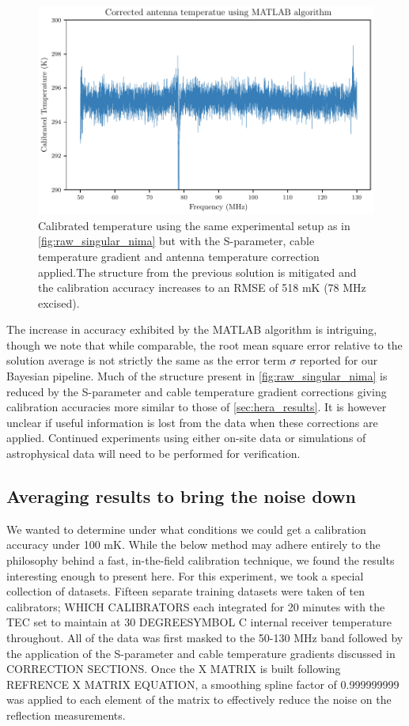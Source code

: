 \begin{figure}
    \centering
    \includegraphics[width=.8\textwidth]{corrected_matlab_solution}
    \caption{Calibrated temperature using the same experimental setup as in \cref{fig:raw_singular_nima} but with the S-parameter, cable temperature gradient and antenna temperature correction applied.The structure from the previous solution is mitigated and the calibration accuracy increases to an RMSE of 518 mK (78 MHz excised).}
    \label{fig:corrected_singular_nima}
\end{figure}

The increase in accuracy exhibited by the MATLAB algorithm is intriguing, though we note that while comparable, the root mean square error relative to the solution average is not strictly the same as the error term $\sigma$ reported for our Bayesian pipeline. Much of the structure present in \cref{fig:raw_singular_nima} is reduced by the S-parameter and cable temperature gradient corrections giving calibration accuracies more similar to those of \cref{sec:hera_results}. It is however unclear if useful information is lost from the data when these corrections are applied. Continued experiments using either on-site data or simulations of astrophysical data will need to be performed for verification.

\subsection{Averaging results to bring the noise down}\label{matlab_avg_results}
We wanted to determine under what conditions we could get a calibration accuracy under 100 mK. While the below method may adhere entirely to the philosophy behind a fast, in-the-field calibration technique, we found the results interesting enough to present here. For this experiment, we took a special collection of datasets. Fifteen separate training datasets were taken of ten calibrators; WHICH CALIBRATORS each integrated for 20 minutes with the TEC set to maintain at 30 DEGREESYMBOL C internal receiver temperature throughout. All of the data was first masked to the 50-130 MHz band followed by the application of the S-parameter and cable temperature gradients discussed in CORRECTION SECTIONS. Once the X MATRIX is built following REFRENCE X MATRIX EQUATION, a smoothing spline factor of 0.999999999 was applied to each element of the matrix to effectively reduce the noise on the reflection measurements.

